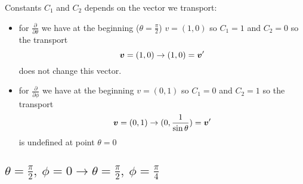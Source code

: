 %
Constants $C_1$ and $C_2$ depends on the vector we transport:
\begin{itemize}
    \item for $\frac{\partial}{\partial \theta}$ we have at the beginning
          ($\theta = \frac{\pi}{2}$) $v=(1,0)$ so $C_1 = 1$ and $C_2 = 0$ so the
          transport
          \begin{equation}
              \boldsymbol{v} = (1,0) \rightarrow (1,0) = \boldsymbol{v}'
          \end{equation}
          does not change this vector.
    \item for $\frac{\partial}{\partial \phi}$ we have at the beginning
          $v=(0,1)$ so $C_1 = 0$ and $C_2 = 1$ so the transport
          \begin{equation}
              \boldsymbol{v} = (0,1) \rightarrow (0,\frac{1}{\sin\theta}) = \boldsymbol{v}'
          \end{equation}
          is undefined at point $\theta = 0$
\end{itemize}

\subsection*{$\theta = \frac{\pi}{2},~\phi = 0 \rightarrow \theta = \frac{\pi}{2},~ \phi = \frac{\pi}{4}$}

